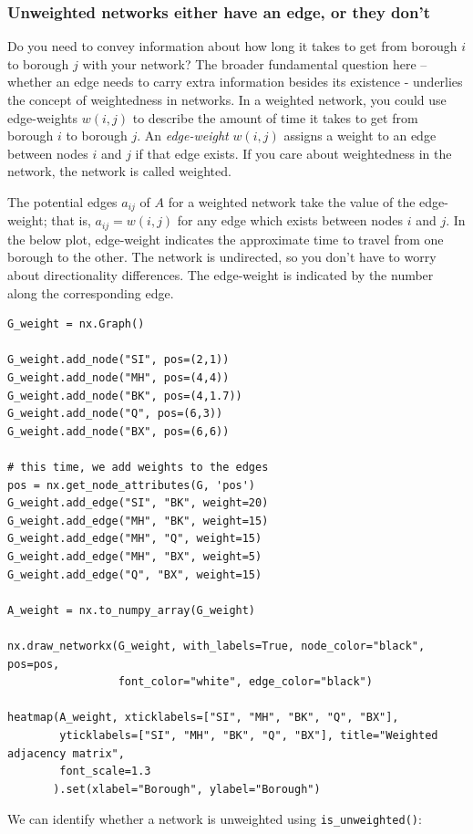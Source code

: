 \subsubsection{Unweighted networks either have an edge, or they don't}

Do you need to convey information about how long it takes to get from borough $i$ to borough $j$ with your network? The broader fundamental question here -- whether an edge needs to carry extra information besides its existence - underlies the concept of {weightedness} in networks. In a weighted network, you could use {edge-weights} $w(i, j)$ to describe the amount of time it takes to get from borough $i$ to borough $j$. An \textit{edge-weight} $w(i,j)$ assigns a weight to an edge between nodes $i$ and $j$ if that edge exists. If you care about weightedness in the network, the network is called {weighted}. 

The potential edges $a_{ij}$ of $A$ for a weighted network take the value of the edge-weight; that is, $a_{ij} = w(i, j)$ for any edge which exists between nodes $i$ and $j$. In the below plot, edge-weight indicates the approximate time to travel from one borough to the other. The network is undirected, so you don't have to worry about directionality differences. The edge-weight is indicated by the number along the corresponding edge.

\begin{lstlisting}[style=python]
G_weight = nx.Graph()

G_weight.add_node("SI", pos=(2,1))
G_weight.add_node("MH", pos=(4,4))
G_weight.add_node("BK", pos=(4,1.7))
G_weight.add_node("Q", pos=(6,3))
G_weight.add_node("BX", pos=(6,6))

# this time, we add weights to the edges
pos = nx.get_node_attributes(G, 'pos')
G_weight.add_edge("SI", "BK", weight=20)
G_weight.add_edge("MH", "BK", weight=15)
G_weight.add_edge("MH", "Q", weight=15)
G_weight.add_edge("MH", "BX", weight=5)
G_weight.add_edge("Q", "BX", weight=15)

A_weight = nx.to_numpy_array(G_weight)

nx.draw_networkx(G_weight, with_labels=True, node_color="black", pos=pos,
                 font_color="white", edge_color="black")

heatmap(A_weight, xticklabels=["SI", "MH", "BK", "Q", "BX"],
        yticklabels=["SI", "MH", "BK", "Q", "BX"], title="Weighted adjacency matrix", 
        font_scale=1.3
       ).set(xlabel="Borough", ylabel="Borough")

\end{lstlisting}
We can identify whether a network is unweighted using \texttt{is\_unweighted()}:



